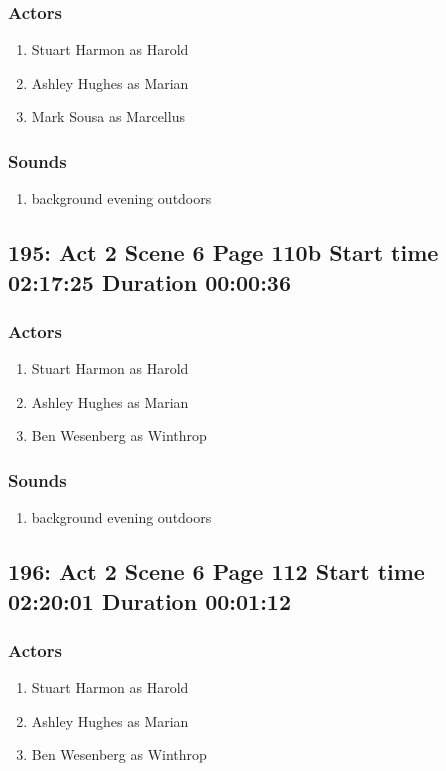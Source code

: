 \subsubsection{Actors}
\begin{enumerate}
\item Stuart Harmon as Harold
\item Ashley Hughes as Marian
\item Mark Sousa as Marcellus
\end{enumerate}

\subsubsection{Sounds}
\begin{enumerate}
\item background evening outdoors
\end{enumerate}
\subsection{195: Act 2 Scene 6 Page 110b Start time 02:17:25 Duration 00:00:36}

\subsubsection{Actors}
\begin{enumerate}
\item Stuart Harmon as Harold
\item Ashley Hughes as Marian
\item Ben Wesenberg as Winthrop
\end{enumerate}

\subsubsection{Sounds}
\begin{enumerate}
\item background evening outdoors
\end{enumerate}
\subsection{196: Act 2 Scene 6 Page 112 Start time 02:20:01 Duration 00:01:12}

\subsubsection{Actors}
\begin{enumerate}
\item Stuart Harmon as Harold
\item Ashley Hughes as Marian
\item Ben Wesenberg as Winthrop
\end{enumerate}


